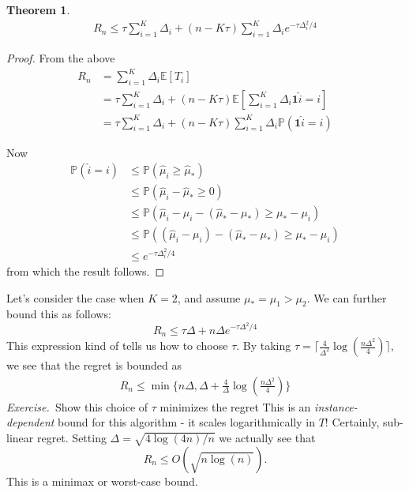 \documentclass[11pt]{article}
\newtheorem{theorem}{Theorem}
\newcommand{\exercise}{\noindent\textit{Exercise.\  }}
\renewcommand{\P}{\mathbb{P}}
\newcommand{\E}{\mathbb{E}}
\newcommand{\1}{\mathbf{1}}
\begin{document}
\begin{theorem}
      \begin{align*}
        R_n \leq  \tau\sum_{i=1}^K \Delta_i + (n-K\tau)\sum_{i=1}^K \Delta_i e^{-\tau\Delta_i^2/4}
      \end{align*}
\end{theorem}
\begin{proof}
    From the above
    \begin{align*}
        R_n 
        &= \sum_{i=1}^K \Delta_i \E[T_i]\\
        &= \tau\sum_{i=1}^K \Delta_i + (n-K\tau)\E[\sum_{i=1}^K \Delta_i\1{\hat{i}=i}]\\
        &= \tau\sum_{i=1}^K \Delta_i + (n-K\tau)\sum_{i=1}^K \Delta_i\P(\1{\hat{i}=i})
    \end{align*}

Now
\begin{align*}
    \P(\hat{i} = i)
    &\leq \P(\hat{\mu}_{i} \geq \hat{\mu}_{\ast})\\
    &\leq \P(\hat{\mu}_{i}  - \hat{\mu}_{\ast} \geq 0)\\
    &\leq \P(\hat{\mu}_{i} - \mu_i  - (\hat{\mu}_{\ast}-\mu_{\ast}) \geq \mu_{\ast} - \mu_i)\\
    &\leq \P((\hat{\mu}_{i} - \mu_i)  - (\hat{\mu}_{\ast}-\mu_{\ast}) \geq \mu_{\ast} - \mu_i)\tag{This is $2/\tau$-subGaussian}\\
    &\leq e^{-\tau\Delta_i^2/4}
\end{align*}
from which the result follows.
\end{proof}

Let's consider the case when $K=2$, and assume $\mu_{\ast} = \mu_1 > \mu_2$. We can further bound this as follows:
\[R_n \leq \tau \Delta + n\Delta e^{-\tau\Delta^2/4}\]
This expression kind of tells us how to choose $\tau$.  By taking $\tau =\lceil \frac{4}{\Delta^2} \log\left(\frac{n\Delta^2}{4}\right)\rceil$, we see that the regret is bounded as
\begin{align*}
    R_n \leq \min\{n\Delta,  \Delta + \frac{4}{\Delta}\log\left(\frac{n\Delta^2}{4}\right)\}
\end{align*}
\exercise Show this choice of $\tau$ minimizes the regret
This is an \textit{instance-dependent} bound for this algorithm - it scales logarithmically in $T$! Certainly, sub-linear regret. Setting $\Delta = \sqrt{4\log(4n)/n}$ we actually see that
\[R_n \leq O(\sqrt{n\log(n)}).\]
 This is a minimax or worst-case bound.
\end{document}
